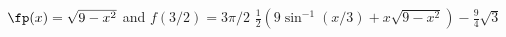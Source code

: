 {$\fp(x) = \sqrt{9-x^2}$ and $f(3/2)=3\pi/2$
}
{$\frac12\left(9\sin^{-1}(x/3)+x\sqrt{9-x^2}\right)-\frac{9}{4}\sqrt{3}$
}

